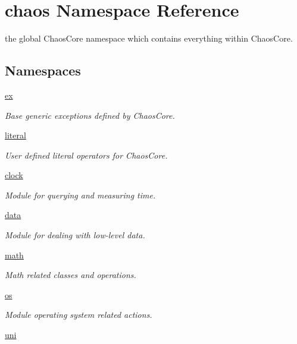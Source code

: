 \hypertarget{namespacechaos}{\section{chaos Namespace Reference}
\label{namespacechaos}
}


the global Chaos\-Core namespace which contains everything within Chaos\-Core.  


\subsection*{Namespaces}
\begin{DoxyCompactItemize}
\item 
\hyperlink{namespacechaos_1_1ex}{ex}
\begin{DoxyCompactList}\small\item\em Base generic exceptions defined by Chaos\-Core. \end{DoxyCompactList}\item 
\hyperlink{namespacechaos_1_1literal}{literal}
\begin{DoxyCompactList}\small\item\em User defined literal operators for Chaos\-Core. \end{DoxyCompactList}\item 
\hyperlink{namespacechaos_1_1clock}{clock}
\begin{DoxyCompactList}\small\item\em Module for querying and measuring time. \end{DoxyCompactList}\item 
\hyperlink{namespacechaos_1_1data}{data}
\begin{DoxyCompactList}\small\item\em Module for dealing with low-\/level data. \end{DoxyCompactList}\item 
\hyperlink{namespacechaos_1_1math}{math}
\begin{DoxyCompactList}\small\item\em Math related classes and operations. \end{DoxyCompactList}\item 
\hyperlink{namespacechaos_1_1os}{os}
\begin{DoxyCompactList}\small\item\em Module operating system related actions. \end{DoxyCompactList}\item 
\hyperlink{namespacechaos_1_1uni}{uni}

\end{DoxyCompactItemize}
